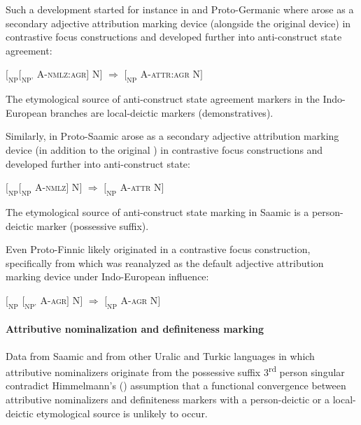Such a development started for instance in  and Proto\hyp{}Germanic where  arose as a secondary adjective attribution marking device (alongside the original  device) in contrastive focus constructions and developed further into anti\hyp{}construct state agreement:
\begin{exe}
\ex \rm{$[_{\text{NP}} [_{\text{NP'}}$ A-\textsc{nmlz:agr}$]$ N$]$ $\Rightarrow$ $[_{\text{NP}}$ A-\textsc{attr:agr} N$]$}
\end{exe}
The etymological source of anti\hyp{}construct state agreement markers in the Indo-European branches are local-deictic markers (demonstratives).

Similarly, in Proto\hyp{}Saamic  arose as a secondary adjective attribution marking device (in addition to the original ) in contrastive focus constructions and developed further into anti\hyp{}construct state:
\begin{exe}
\ex \rm{$[_{\text{NP}} [_{\text{NP}}$ A-\textsc{nmlz}$]$ N$]$ $\Rightarrow$ $[_{\text{NP}}$ A-\textsc{attr} N$]$}
\end{exe}
The etymological source of anti\hyp{}construct state marking in Saamic is a person-deictic marker (possessive suffix).

Even Proto\hyp{}Finnic  likely originated in a contrastive focus construction, specifically from  which was reanalyzed as the default adjective attribution marking device under Indo-European influence:
\begin{exe}
\ex \rm{$[_{\text{NP}}$ $[_{\text{NP'}}$ A-\textsc{agr}$]$ N$]$ $\Rightarrow$ $[_{\text{NP}}$ A-\textsc{agr} N$]$}
\end{exe}

\paragraph*{Attributive nominalization and definiteness marking}
Data from Saamic and from other Uralic and Turkic languages in which attributive nominalizers originate from the possessive suffix 3\textsuperscript{rd} person singular contradict Himmelmann's (\citeyear[220–221]{himmelmann1997}) assumption that a functional convergence between attributive nominalizers and definiteness markers with a person-deictic or a local-deictic etymological source is unlikely to occur. 

